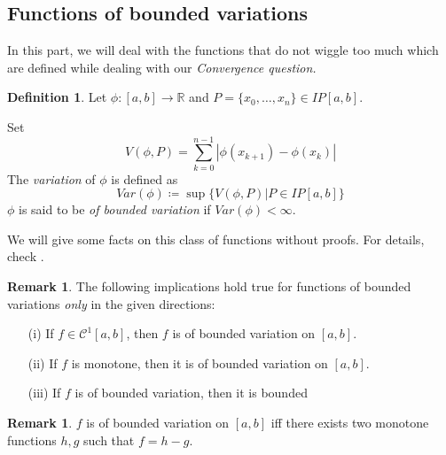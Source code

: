 \documentclass[12pt]{amsart}
\theoremstyle{definition}
\newtheorem{definition}[theorem]{Definition}
\newtheorem{remark}[theorem]{Remark}
\newcommand{\RR}{{\mathbb R}} %
\newcommand{\cC}{{\mathcal C}}
\begin{document}
\subsection{Functions of bounded variations}


In this part, we will deal with the functions that do not wiggle too much\footnotemark{} which are defined while dealing with our \emph{Convergence question.}




\begin{definition}
    Let $\phi : [a,b] \to \RR$ and $P = \{x_0, \dots, x_n\} \in IP[a,b]$.
\footnotemark{}




Set
\[
V(\phi,P) = \sum_{k=0}^{n-1}|\phi(x_{k+1}) - \phi(x_{k})|
\]
The \emph{variation} of $\phi$ is defined as
\begin{equation}
    Var(\phi) \coloneqq \sup\{V(\phi,P)| P \in IP[a,b]\}
\end{equation}
$\phi$ is said to be \emph{of bounded variation} if $Var(\phi) < \infty$. \footnotemark{}
\end{definition}


We will give some facts on this class of functions without proofs. For details, check \cite{Wade}.


\begin{remark} \label{bounded var. implications}The following implications hold true for functions of bounded variations \emph{only} in the given directions:
    \begin{itemize}
        \item[(i)] If  $f \in \cC^1[a,b]$, then $f$ is of bounded variation on $[a, b]$.
        \item[(ii)] If  $f$ is monotone, then it is of bounded variation on $[a, b]$.
        \item[(iii)] If $f$ is of bounded variation, then it is bounded
    \end{itemize}
\end{remark}


\begin{remark}
     $f$ is of bounded variation on $[a,b]$ iff there exists two monotone functions $h,g$ such that $f = h - g$.
\end{remark}
\end{document}
